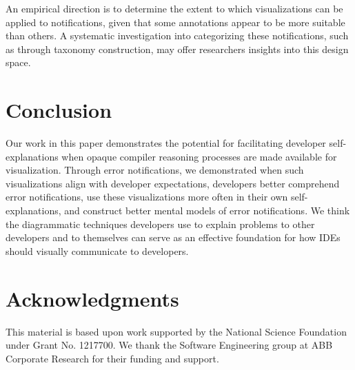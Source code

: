 \documentclass[conference]{IEEEtran}
\begin{document}
An empirical direction is to determine the extent to which visualizations can be applied to notifications, given that some annotations appear to be more suitable than others. A systematic investigation into categorizing these notifications, such as through taxonomy construction, may offer researchers insights into this design space.



\section{Conclusion}

Our work in this paper demonstrates the potential for facilitating developer self-explanations when opaque compiler reasoning processes are made available for visualization. Through error notifications, we demonstrated when such visualizations align with developer expectations, developers better comprehend error notifications, use these visualizations more often in their own self-explanations, and construct better mental models of error notifications. We think the diagrammatic techniques developers use to explain problems to other developers and to themselves can serve as an effective foundation for how IDEs should visually communicate to developers.

\section*{Acknowledgments}

This material is based upon work supported by the National Science Foundation under Grant No. 1217700. We thank the Software Engineering group at ABB Corporate Research for their funding and support.
\end{document}
